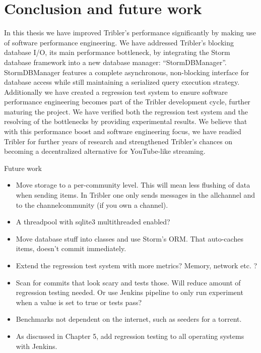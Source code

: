 \chapter{Conclusion and future work}
\label{cpt:conclusion_and_future_work}

In this thesis we have improved Tribler's performance significantly by making use of software performance engineering.
We have addressed Tribler's blocking database I/O, its main performance bottleneck, by integrating the Storm database framework into a new database manager: \enquote{StormDBManager}.
StormDBManager features a complete asynchronous, non-blocking interface for database access while still maintaining a serialized query execution strategy.
Additionally we have created a regression test system to ensure software performance engineering becomes part of the Tribler development cycle, further maturing the project.
We have verified both the regression test system and the resolving of the bottlenecks by providing experimental results.
We believe that with this performance boost and software engineering focus, we have readied Tribler for further years of research and strengthened Tribler's chances on becoming a decentralized alternative for YouTube-like streaming.


Future work

\begin{itemize}
	\item Move storage to a per-community level. This will mean less flushing of data when sending items. In Tribler one only sends messages in the allchannel and to the channelcommunity (if you own a channel).
	\item A threadpool with sqlite3 multithreaded enabled? 
	\item Move database stuff into classes and use Storm's ORM. That auto-caches items, doesn't commit immediately.
	\item Extend the regression test system with more metrics? Memory, network etc. ?
	\item Scan for commits that look scary \cite{huang2014performance} and tests those. Will reduce amount of regression testing needed. Or use Jenkins pipeline to only run experiment when a value is set to true or tests pass?
	\item Benchmarks not dependent on the internet, such as seeders for a torrent.
	\item As discussed in Chapter 5, add regression testing to all operating systems with Jenkins.
\end{itemize}